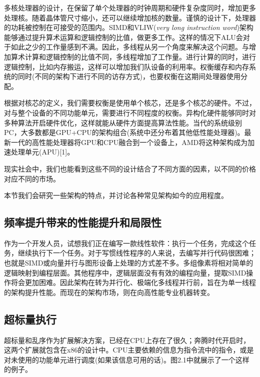 多核处理器的设计，在保留了单个处理器的时钟周期和硬件复杂度同时，增加更多处理核。随着晶体管尺寸缩小，还可以继续增加核的数量。谨慎的设计下，处理器的功耗被控制在可接受的范围内。SIMD和VLIW(\emph{very long instruction word})架构能够通过提升算术运算和逻辑控制的比值，做更多工作。这样的情况下ALU会对于如此之少的工作量感到不满。因此，多线程从另一个角度来解决这个问题。与增加算术计算和逻辑控制的比值不同，多线程增加了工作量。进行计算的同时，进行逻辑控制，比如内存搬运，这样可以增加我们队设备的利用率。权衡缓存和内存系统的同时(不同的架构下进行不同的访存方式)，也要权衡在这期间处理器使用分配。

根据对核芯的定义，我们需要权衡是使用单个核芯，还是多个核芯的硬件。不过，对与整个设备的不同功能单元，需要进行不同程度的权衡。异构化硬件能够同时对多种算法开启硬件优化，这样就能从硬件方面提高算法性能。当代的系统级别PC，大多数都是GPU+CPU的架构组合(系统中还分布着其他低性能处理器)。最新一代的高性能处理器将GPU和CPU融合到一个设备上，AMD将这种架构成为加速处理单元(APU)[1]。

现实社会中，我们也能看到这些不同的设计结合了不同方面的因素，以不同的价格对应不同的市场。

本节我们会研究一些架构的特点，并讨论各种常见架构如今的应用程度。

\subsection{频率提升带来的性能提升和局限性}

作为一个开发人员，试想我们正在编写一款线性软件：执行一个任务，完成这个任务，继续执行下一个任务。对于写惯线性程序的人来说，去编写并行代码很困难；也就是SIMD或向量并行与图形设备上处理的方式差不多。多组像素将相对简单的逻辑映射到编程层面。其他程序中，逻辑层面没有有效的编程向量，提取SIMD操作将会更加困难。因此架构在转为并行化、极端化多线程并行前，旨在为单一线程的架构提升性能。而现在的架构市场，则在向高性能专业机器转变。


\subsection{超标量执行}

超标量和乱序作为扩展解决方案，已经在CPU上存在了很久；奔腾时代开启时，这两个扩展就包含在x86的设计中。CPU主要依赖的信息为指令流中的指令，或是对未使用的功能单元进行调度(如果该信息可用的话)。图2.1中就展示了一个这样的例子。


